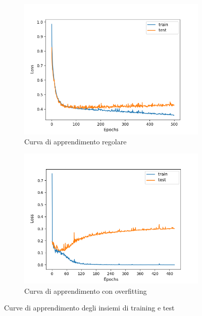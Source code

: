 \documentclass[12pt, twoside, letterpaper]{report}
\begin{document}
				\begin{figure}
				\begin{subfigure}[]{.5\textwidth}
					\centering
					\includegraphics[width=\linewidth]{learning_curve.png}
					\caption{Curva di apprendimento regolare}
					\label{fig:learning_curve}
				\end{subfigure}
				\hfill
				\begin{subfigure}[]{.5\textwidth}
					\centering
					\includegraphics[width=\linewidth]{overfitting.png}
					\caption{Curva di apprendimento con overfitting}
					\label{fig:overfitting}
				\end{subfigure}
				
				\caption{Curve di apprendimento degli insiemi di training e test}
				\label{fig:curve_di_apprendimento}
				\end{figure}
				
\end{document}
